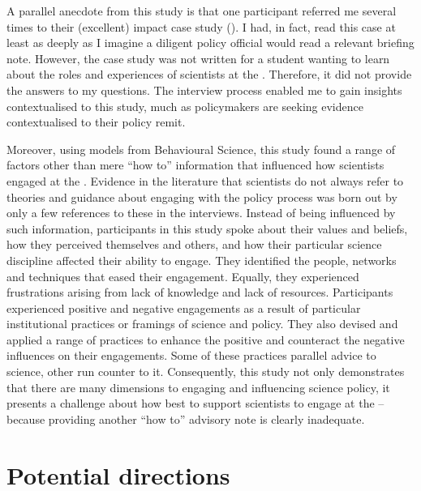 A parallel anecdote from this study is that one participant referred me several times to their (excellent) impact case study (). I had, in fact, read this case at least as deeply as I imagine a diligent policy official would read a relevant briefing note. However, the case study was not written for a student wanting to learn about the roles and experiences of scientists at the \CAN{} \SPI. Therefore, it did not provide the answers to my questions. The interview process enabled me to gain insights contextualised to this study, much as policymakers are seeking evidence contextualised to their policy remit. 

Moreover, using models from Behavioural Science, this study found a range of factors other than mere ``how to'' information that influenced how scientists engaged at the \SPI. Evidence in the literature that scientists do not always refer to theories and guidance about engaging with the policy process was born out by only a few references to these in the interviews. Instead of being influenced by such information, participants in this study spoke about their values and beliefs, how they perceived themselves and others, and how their particular science discipline affected their ability to engage. They identified the people, networks and techniques that eased their engagement. Equally, they experienced frustrations arising from lack of knowledge and lack of resources. Participants experienced positive and negative engagements as a result of particular institutional practices or framings of \CAN{} science and policy. They also devised and applied a range of practices to enhance the positive and counteract the negative influences on their engagements. Some of these practices parallel advice to science, other run counter to it. Consequently, this study not only demonstrates that there are many dimensions to engaging and influencing \CAN{} science policy, it presents a challenge about how best to support scientists to engage at the \SPI{} -- because providing another ``how to'' advisory note is clearly inadequate.



\section{Potential directions}\label{sec:disdirections}

